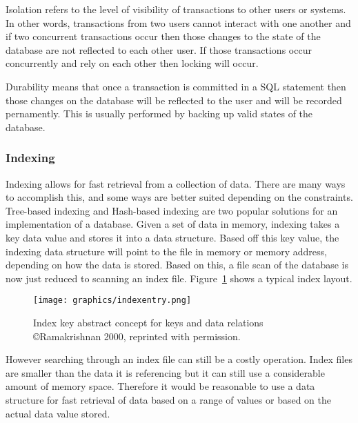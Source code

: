 \documentclass[letterpaper, 11pt]{article}
\begin{document}
Isolation refers to the level of visibility of transactions to other users or systems. In other words,
transactions from two users cannot interact with one another and if two concurrent transactions occur then
those changes to the state of the database are not reflected to each other user. If those transactions occur
concurrently and rely on each other then locking will occur.
\par\vspace{\baselineskip}

Durability means that once a transaction is committed in a SQL statement then those changes on the database 
will be reflected to the user and will be recorded pernamently. This is usually performed by backing 
up valid states of the database.
\par\vspace{\baselineskip}

\subsubsection{Indexing}
Indexing allows for fast retrieval from a collection of data. There are many ways to accomplish this,
and some ways are better suited depending on the constraints. Tree-based indexing and Hash-based indexing
are two popular solutions for an implementation of a database. Given a set of data in memory, indexing takes
a key data value and stores it into a data structure. Based off this key value, the indexing data structure
will point to the file in memory or memory address, depending on how the data is stored. Based on this, a
file scan of the database is now just reduced to scanning an index file. Figure~\ref{fig:index_entry} shows
a typical index layout.
\par\vspace{\baselineskip}

\begin{figure}
  \centering
  \texttt{[image: graphics/indexentry.png]}
  \caption{Index key abstract concept for keys and data relations \newline \copyright Ramakrishnan 2000, reprinted with permission.\cite{ramakrishnan2000database}}
  \label{fig:index_entry}
\end{figure}

However searching through an index file can still be a costly operation. Index files are smaller than the
data it is referencing but it can still use a considerable amount of memory space. Therefore it would be
reasonable to use a data structure for fast retrieval of data based on a range of values or based on
the actual data value stored.
\par\vspace{\baselineskip}
\end{document}
